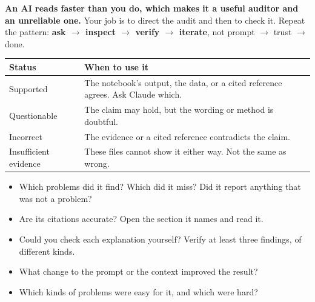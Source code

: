 \textbf{An AI reads faster than you do, which makes it a useful auditor and an unreliable one.} Your job is to direct the audit and then to check it. Repeat the pattern: \textbf{ask $\rightarrow$ inspect $\rightarrow$ verify $\rightarrow$ iterate}, not prompt $\rightarrow$ trust $\rightarrow$ done.

\renewcommand{\arraystretch}{1.12}
\begin{tabularx}{\linewidth}{@{}p{1.55in}X@{}}
\toprule
\textbf{Status} & \textbf{When to use it}\\
\midrule
Supported & The notebook's output, the data, or a cited reference agrees. Ask Claude which.\\
Questionable & The claim may hold, but the wording or method is doubtful.\\
Incorrect & The evidence or a cited reference contradicts the claim.\\
Insufficient evidence & These files cannot show it either way. Not the same as wrong.\\
\bottomrule
\end{tabularx}

\begin{itemize}
  \item Which problems did it find? Which did it miss? Did it report anything that was not a problem?
  \item Are its citations accurate? Open the section it names and read it.
  \item Could you check each explanation yourself? Verify at least three findings, of different kinds.
  \item What change to the prompt or the context improved the result?
  \item Which kinds of problems were easy for it, and which were hard?
\end{itemize}

